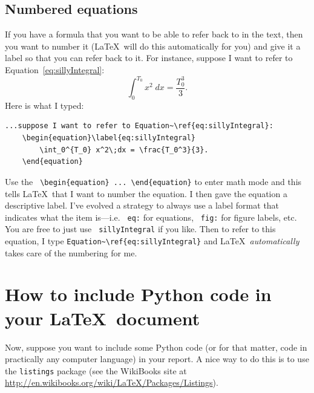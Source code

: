 \subsection{Numbered equations}
If you have a formula that you want to be able to refer back to in the text, then you want to number it (\LaTeX\ will do this automatically for you) and give it a label so that you can refer back to it. For instance, suppose I want to refer to Equation~\ref{eq:sillyIntegral}:
\begin{equation}\label{eq:sillyIntegral}
	\int_0^{T_0} x^2\;dx = \frac{T_0^3}{3}.
\end{equation}
Here is what I typed:
\begin{verbatim}
...suppose I want to refer to Equation~\ref{eq:sillyIntegral}:
	\begin{equation}\label{eq:sillyIntegral}
		\int_0^{T_0} x^2\;dx = \frac{T_0^3}{3}.
	\end{equation}
\end{verbatim}
Use the \verb! \begin{equation} ... \end{equation}! to enter math mode and this tells \LaTeX\ that I want to number the equation. I then gave the equation a descriptive label. I've evolved a strategy to always use a label format that indicates what the item is---i.e. \verb! eq:! for equations, \verb! fig:! for figure labels, etc. You are free to just use \verb! sillyIntegral! if you like. Then to refer to this equation, I type \verb!Equation~\ref{eq:sillyIntegral}! and \LaTeX\  \textit{automatically} takes care of the numbering for me. 
	
\section{How to include Python code in your \LaTeX\ document}\label{sec:listings}

Now, suppose you want to include some Python code (or for that matter, code in practically any computer language) in your report. A nice way to do this is to use the \verb!listings! package (see the WikiBooks site at \href{http://en.wikibooks.org/wiki/LaTeX/Packages/Listings}{http://en.wikibooks.org/wiki/LaTeX/Packages/Listings}). 


